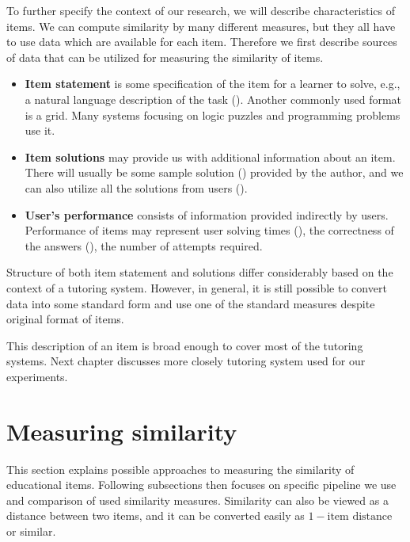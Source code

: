 \documentclass[
  digital, %
  table,   %
  nolof,     %
  nolot,     %
  nocover,
  color,
  final, %
]{fithesis3}
\begin{document}

To further specify the context of our research, we will describe characteristics of items. We can compute similarity by many different measures, but they all have to use data which are available for each item. Therefore we first describe sources of data that can be utilized for measuring the similarity of items.

\begin{itemize}
\item
  \textbf{Item statement} is some specification of the item for a learner to solve, e.g., a natural language description of the task (). Another commonly used format is a grid. Many systems focusing on logic puzzles and programming problems use it.
\item
  \textbf{Item solutions} may provide us with additional information about an item. There will usually be some sample solution () provided by the author, and we can also utilize all the solutions from users ().
\item
  \textbf{User's performance} consists of information provided indirectly by users. Performance of items may represent user solving times (), the correctness of the answers (), the number of attempts required.
\end{itemize}

Structure of both item statement and solutions differ considerably based on the context of a tutoring system. However, in general, it is still possible to convert data into some standard form and use one of the standard measures despite original format of items.

This description of an item is broad enough to cover most of the tutoring systems. Next chapter discusses more closely tutoring system used for our experiments.


\section{Measuring similarity}\label{measuring-similarity}

This section explains possible approaches to measuring the similarity of educational items. Following subsections then focuses on specific pipeline we use and comparison of used similarity measures. Similarity can also be viewed as a distance between two items, and it can be converted easily as $1 - \text{item distance}$ or similar.
\end{document}
